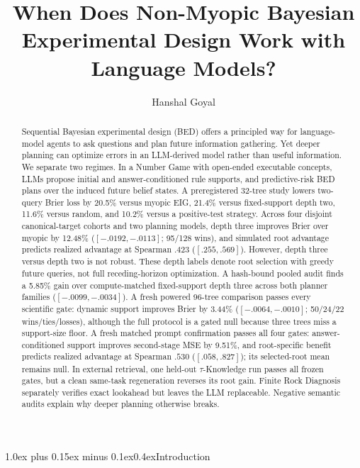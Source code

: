 \documentclass[10pt]{article}
\title{When Does Non-Myopic Bayesian Experimental Design Work with Language Models?}
\author{Hanshal Goyal}
\date{}
\makeatletter
\renewcommand{\maketitle}{%
  \begin{center}
    {\LARGE \@title\par}
    \vspace{0.4em}
    {\normalsize \@author\par}
  \end{center}
  \vspace{0.3em}
}
\renewcommand\section{\@startsection{section}{1}{0pt}%
  {1.0ex plus 0.15ex minus 0.1ex}{0.4ex}{\normalfont\Large\bfseries}}
\providecommand{\BongardAbstractResult}{}
\makeatother
\begin{document}
\maketitle

\begin{abstract}
Sequential Bayesian experimental design (BED) offers a principled way for
language-model agents to ask questions and plan future information gathering.
Yet deeper planning can optimize errors in an LLM-derived model rather than
useful information. We separate two regimes. In a Number Game with open-ended
executable concepts, LLMs propose initial and answer-conditioned rule supports,
and predictive-risk BED plans over the induced future belief states. A
preregistered 32-tree study lowers two-query Brier loss by 20.5\% versus
myopic EIG, 21.4\% versus fixed-support depth two, 11.6\% versus random, and
10.2\% versus a positive-test strategy. Across four disjoint canonical-target
cohorts and two planning models, depth three improves Brier over myopic by
12.48\% ($[-.0192,-.0113]$; 95/128 wins), and simulated root advantage
predicts realized advantage at Spearman $.423$ ($[.255,.569]$). However,
depth three versus depth two is not robust. These depth labels denote root
selection with greedy future queries, not full receding-horizon optimization.
A hash-bound pooled audit finds a
5.85\% gain over compute-matched fixed-support depth three across both
planner families ($[-.0099,-.0034]$). A fresh powered 96-tree comparison
passes every scientific gate: dynamic support improves Brier by 3.44\%
($[-.0064,-.0010]$; 50/24/22 wins/ties/losses), although the full protocol
is a gated null because three trees miss a support-size floor. A fresh matched
prompt confirmation passes all four gates: answer-conditioned support improves
second-stage MSE by 9.51\%, and root-specific benefit predicts realized
advantage at Spearman $.530$ ($[.058,.827]$); its selected-root mean remains
null. In external retrieval, one held-out $\tau$-Knowledge run passes all
frozen gates, but a clean same-task regeneration reverses its root gain.
\BongardAbstractResult Finite Rock Diagnosis separately
verifies exact lookahead but leaves the LLM replaceable. Negative semantic
audits explain why deeper planning otherwise breaks.
\end{abstract}

\fontsize{9}{9.3}\selectfont

\section{Introduction}
\end{document}
